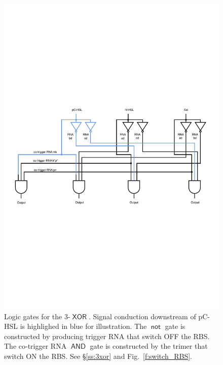 \documentclass[12pt,notitlepage]{article}
\newcommand{\NOT}{\ensuremath{\mathop{\mathsf{not}}}\xspace}
\newcommand{\AND}{\ensuremath{\mathop{\mathsf{AND}}}\xspace}
\newcommand{\XOR}{\ensuremath{\mathop{\mathsf{XOR}}}\xspace}
\newcommand{\hh}[1]{{\color{Purple}#1}}
\begin{document}
\begin{figure}
    \centering
    \includegraphics[width = \linewidth]{xor_ribocomputing/logic_gate_3xor}
    \caption{
    \hh{
    Logic gates for the 3-\XOR . Signal conduction downstream of pC-HSL is highlighed in blue for illustration. The \NOT gate is constructed by producing trigger RNA that switch OFF the RBS. The co-trigger RNA \AND gate is constructed by the trimer that switch ON the RBS. See \S\ref{ss:3xor} and Fig.~\ref{f:switch_RBS}.
    }
    }
    \label{f:logical_gates_3xor}
\end{figure}

%
\end{document}
